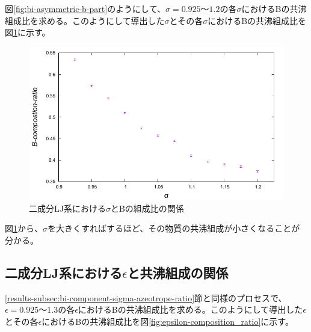 \documentclass[titlepage]{jsreport}
\begin{document}
\newpage
図\ref{fig:bi-asymmetric-b-part}のようにして、$\sigma=0.925〜1.2$の各$\sigma$におけるBの共沸組成比を求める。このようにして導出した$\sigma$とその各$\sigma$におけるBの共沸組成比を図\ref{fig:sigma-composition_ratio}に示す。

\begin{figure}[htbp]
    \begin{center}
        \includegraphics[width=14cm]{fig/sigma-composition_ratio/sigma-composition_ratio.pdf}
    \end{center}
    \caption{二成分LJ系における$\sigma$とBの組成比の関係}
    \label{fig:sigma-composition_ratio}
\end{figure}

図\ref{fig:sigma-composition_ratio}から、$\sigma$を大きくすればするほど、その物質の共沸組成が小さくなることが分かる。

\newpage
\subsection{二成分LJ系における$\epsilon$と共沸組成の関係} \label{results-subsec:bi-component-epsilon-azeotrope-ratio}
\ref{results-subsec:bi-component-sigma-azeotrope-ratio}節と同様のプロセスで、$\epsilon=0.925〜1.3$の各$\epsilon$におけるBの共沸組成比を求める。このようにして導出した$\epsilon$とその各$\epsilon$におけるBの共沸組成比を図\ref{fig:epsilon-composition_ratio}に示す。
\end{document}
